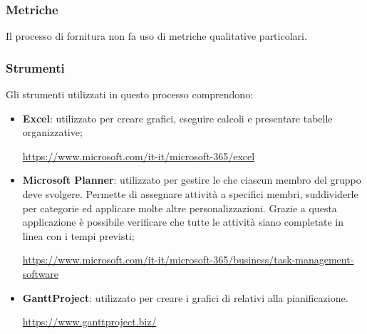 \subsubsection{Metriche}
Il processo di fornitura non fa uso di metriche qualitative particolari.

\subsubsection{Strumenti}
Gli strumenti utilizzati in questo processo comprendono:
\begin{itemize}
	\item \textbf{Excel}: utilizzato per creare grafici, eseguire calcoli e presentare tabelle organizzative; 
	\begin{center}
		\textcolor{blue}{\url{https://www.microsoft.com/it-it/microsoft-365/excel}}
	\end{center}
	\item \textbf{Microsoft Planner}: utilizzato per gestire le  che ciascun membro del gruppo deve svolgere. Permette di assegnare attività a specifici membri, suddividerle per categorie ed applicare molte altre personalizzazioni. Grazie a questa applicazione è possibile verificare che tutte le attività siano completate in linea con i tempi previsti; 
	\begin{center}
		\textcolor{blue}{\url{https://www.microsoft.com/it-it/microsoft-365/business/task-management-software}}
	\end{center}
	\item \textbf{GanttProject}: utilizzato per creare i grafici di  relativi alla pianificazione.
	\begin{center}
		\textcolor{blue}{\url{https://www.ganttproject.biz/}}
	\end{center}
\end{itemize}
